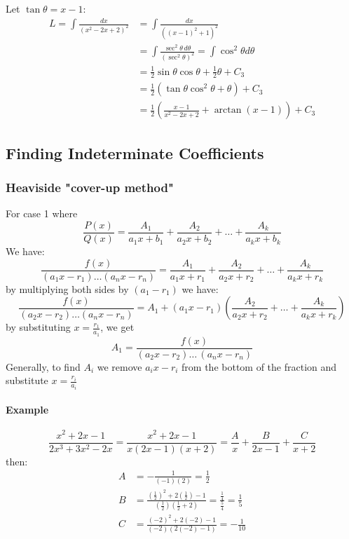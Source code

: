 \documentclass[12pt]{article}
\begin{document}
Let $\tan \theta = x - 1$:
\begin{align*} 
    L = \int \frac{dx}{(x^2 - 2x + 2)^2} &= \int \frac{dx}{((x - 1)^2 + 1)^2} \\
    &= \int \frac{\sec^2 \theta \, d\theta}{(\sec^2 \theta)^2} = \int \cos^2 \theta d \theta \\
    &= \frac{1}{2} \sin \theta \cos \theta + \frac{1}{2} \theta + C_3 \\
    &= \frac{1}{2} (\tan \theta \cos^2 \theta + \theta) + C_3 \\
    &= \frac{1}{2} \left(\frac{x - 1}{x^2 - 2x + 2} + \arctan (x - 1) \right) + C_3
\end{align*}

\subsection{Finding Indeterminate Coefficients}
\subsubsection{Heaviside "cover-up method"}
For case 1 where
\[
    \frac{P(x)}{Q(x)} = \frac{A_1}{a_1x + b_1} + \frac{A_2}{a_2x + b_2} + \dots + \frac{A_k}{a_kx + b_k} 
\]
We have:
\[
    \frac{f(x)}{(a_1x - r_1)\dots (a_nx - r_n)} = \frac{A_1}{a_1x + r_1} + \frac{A_2}{a_2x + r_2} + \dots + \frac{A_k}{a_kx + r_k} 
\]
by multiplying both sides by $(a_1 - r_1)$ we have:
\[
    \frac{f(x)}{(a_2x - r_2)\dots (a_nx - r_n)} = A_1 + (a_1x - r_1) \left( \frac{A_2}{a_2x + r_2} + \dots + \frac{A_k}{a_kx + r_k} \right)
\]
by substituting $x = \frac{r_1}{a_1}$, we get
\[
    A_1 = \frac{f(x)}{(a_2x - r_2) \dots\, (a_nx - r_n)} 
\]
Generally, to find $A_i$ we remove $a_ix - r_i$ from the bottom of the fraction and substitute $x = \frac{r_i}{a_i}$

\paragraph{Example}
\[
    \frac{x^2 + 2x - 1}{2x^3 + 3x^2 - 2x} = \frac{x^2 + 2x - 1}{x(2x - 1)(x + 2)} = \frac{A}{x} + \frac{B}{2x - 1} + \frac{C}{x + 2} 
\]
then:
\begin{align*} 
     A &= - \frac{1}{( - 1)(2)} = \frac{1}{2} \\
     B &= \frac{(\frac{1}{2})^2 + 2(\frac{1}{2}) - 1}{(\frac{1}{2})(\frac{1}{2} + 2)} = \frac{\frac{1}{4}}{\frac{5}{4}} = \frac{1}{5} \\
     C &= \frac{( - 2)^2 + 2( - 2) - 1}{( - 2)(2( - 2) - 1)} = - \frac{1}{10} 
\end{align*}
\end{document}

